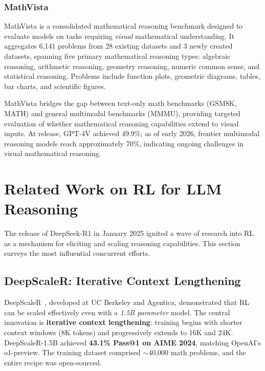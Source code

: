 \documentclass[12pt,a4paper]{report}
\begin{document}
\subsubsection{MathVista}

MathVista \cite{lu2024mathvista} is a consolidated mathematical reasoning benchmark designed to evaluate models on tasks requiring \emph{visual} mathematical understanding. It aggregates 6,141 problems from 28 existing datasets and 3 newly created datasets, spanning five primary mathematical reasoning types: algebraic reasoning, arithmetic reasoning, geometry reasoning, numeric common sense, and statistical reasoning. Problems include function plots, geometric diagrams, tables, bar charts, and scientific figures.

MathVista bridges the gap between text-only math benchmarks (GSM8K, MATH) and general multimodal benchmarks (MMMU), providing targeted evaluation of whether mathematical reasoning capabilities extend to visual inputs. At release, GPT-4V achieved 49.9\%; as of early 2026, frontier multimodal reasoning models reach approximately 70\%, indicating ongoing challenges in visual mathematical reasoning.


\section{Related Work on RL for LLM Reasoning}
\label{sec:related-work-rl-reasoning}

The release of DeepSeek-R1 in January 2025 ignited a wave of research into RL as a mechanism for eliciting and scaling reasoning capabilities. This section surveys the most influential concurrent efforts.

\subsection{DeepScaleR: Iterative Context Lengthening}

DeepScaleR~\cite{luo2025deepscaler}, developed at UC Berkeley and Agentica, demonstrated that RL can be scaled effectively even with a \emph{1.5B parameter} model. The central innovation is \textbf{iterative context lengthening}: training begins with shorter context windows (8K tokens) and progressively extends to 16K and 24K. DeepScaleR-1.5B achieved \textbf{43.1\% Pass@1 on AIME 2024}, matching OpenAI's o1-preview. The training dataset comprised $\sim$40,000 math problems, and the entire recipe was open-sourced.
\end{document}
